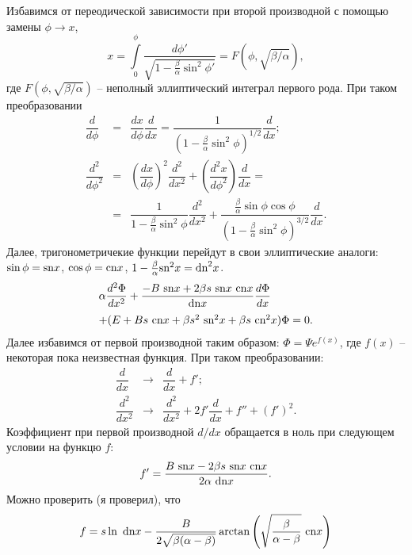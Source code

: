\documentclass[12pt]{article}
\begin{document}
Избавимся от переодической зависимости при второй производной с помощью замены $\phi \to x$,
%
\begin{equation*}
x = \int \limits_0^\phi \dfrac{d \phi'}{\sqrt{1 - \frac{\beta}{\alpha} \sin^2 \phi'}} = F(\phi, \sqrt{\beta / \alpha}),
\end{equation*}
%
где $F(\phi, \sqrt{\beta / \alpha})$ -- неполный эллиптический интеграл первого рода.
При таком преобразовании
%
\begin{eqnarray*}
\dfrac{d}{d \phi} & = & \dfrac{dx}{d \phi} \dfrac{d}{dx} =  \dfrac{1}{(1 - \frac{\beta}{\alpha} \sin^2 \phi)^{1/2}} \dfrac{d}{dx};\\
\dfrac{d^2}{d \phi^2} & = & \left( \dfrac{dx}{d\phi} \right)^2 \dfrac{d^2}{dx^2} + \left( \dfrac{d^2 x}{d \phi^2} \right) \dfrac{d}{dx} = \\
& = & \dfrac{1}{1 - \frac{\beta}{\alpha} \sin^2 \phi} \dfrac{d^2}{dx^2} + \dfrac{\frac{\beta}{\alpha} \sin \phi \cos \phi}{(1 - \frac{\beta}{\alpha} \sin^2 \phi)^{3/2}} \dfrac{d}{dx}.
\end{eqnarray*}
%
Далее, тригонометричекие функции перейдут в свои эллиптические аналоги: $\sin \phi = \textrm{sn} x$, $\cos \phi = \textrm{cn} x$, $1 - \frac{\beta}{\alpha} \textrm{sn}^2 x = \textrm{dn}^2 x$.
%
\begin{equation}
\begin{array}{l}
	\alpha \dfrac{d^2 \Phi}{d x^2} + \dfrac{-B~\textrm{sn} x + 2 \beta s~\textrm{sn} x~\textrm{cn} x}{\textrm{dn} x} \dfrac{d \Phi}{dx} \\[10pt]
	+ (E + B s~\textrm{cn} x + \beta s^2~\textrm{sn}^2 x + \beta s~\textrm{cn}^2 x) \Phi = 0.
\end{array}
\end{equation}
%
Далее избавимся от первой производной таким образом: $\Phi = \Psi e^{f(x)}$, где $f(x)$ -- некоторая пока неизвестная функция.
При таком преобразовании:
%
\begin{equation*}
\begin{array}{lcl}
	\dfrac{d}{dx} & \to & \dfrac{d}{dx} + f';\\[10pt]
	\dfrac{d^2}{dx^2} & \to & \dfrac{d^2}{dx^2} + 2f' \dfrac{d}{dx} + f'' + (f')^2.
\end{array}
\end{equation*}
%
Коэффициент при первой производной $d/dx$ обращается в ноль при следующем условии на функцю $f$:
%
\begin{equation}
f' = \dfrac{B~\textrm{sn} x - 2 \beta s~\textrm{sn} x~\textrm{cn} x}{2 \alpha~\textrm{dn} x}.
\label{eq:f_condition}
\end{equation}
%
Можно проверить (я проверил), что
%
\begin{equation}
f = s \ln~\textrm{dn} x - \frac{B}{2 \sqrt{\beta(\alpha - \beta)}} \arctan \left( \sqrt{\frac{\beta}{\alpha - \beta}}~\textrm{cn} x \right)
\end{equation}
\end{document}
